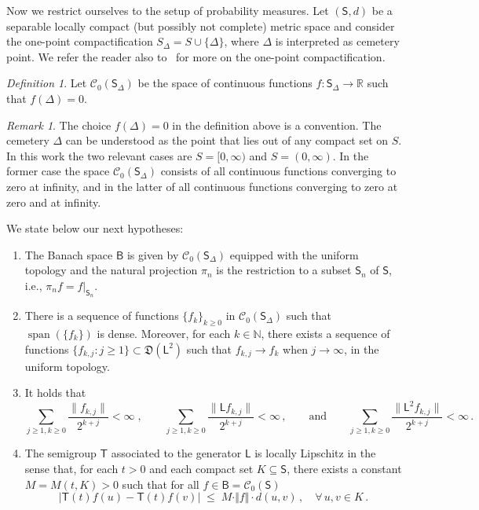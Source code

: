 \documentclass[12pt,a4paper]{article}
\theoremstyle{plain}
\theoremstyle{remark}
\newtheorem{definition}[theorem]{Definition}
\newtheorem{remark}[theorem]{Remark}
\DeclareMathOperator{\spann}{span}
\newcommand{\msf}[1]{{\mathsf #1}}
\newcommand{\mc}[1]{{\mathcal #1}}
\newcommand{\mf}[1]{{\mathfrak #1}}
\newcommand{\bb}[1]{{\mathbb #1}}
\newcommand{\norm}[1]{\lVert#1\rVert}
\begin{document}
	
	Now we restrict ourselves to the setup of probability measures.
	Let $(\msf S,d)$ be a separable  locally compact (but possibly not complete) metric space and consider the one-point compactification $S_\Delta=S\cup \{\Delta\}$, where $\Delta$ is interpreted as cemetery point. We refer the reader also to~\cite{EK} for more on the one-point compactification.
	\begin{definition}\label{def:C_0}
		Let $\mc{C}_0(\msf S_\Delta)$ be the space of continuous functions $f:\msf S_\Delta\to \bb R$ such that $f(\Delta) =0$.
	\end{definition}
	\begin{remark}\label{rem:onepoint}
		The choice $f(\Delta)=0$ in the definition above is a convention. The cemetery $\Delta$ can be understood as the point that lies out of any compact set on $S$. 
		In this work the two relevant cases are $S=[0,\infty)$ and $S=(0,\infty)$. In the former case the space $\mc{C}_0(\msf S_\Delta)$ consists of all continuous functions converging to zero at infinity, and in the latter of all continuous functions converging to zero at zero and at infinity.
	\end{remark}
	We state below our next hypotheses:
	\begin{enumerate}[label=(G\arabic*)]
		\item \label{(G1)} The Banach space $\msf B$ is given by $\mc{C}_0(\msf S_\Delta)$ equipped with the uniform topology and the natural projection $\pi_n$ is the restriction to a subset $\msf S_n$ of $\msf S$, i.e., $\pi_n f= f\vert_{\msf S_n}$.
		\item \label{(G2)} There is a sequence of functions  $\{f_{k}\}_{k\geq 0}$ in $\mc C_0(\msf S_\Delta)$ such that $\spann(\{f_k\})$ is dense. Moreover, for each $k \in \bb{N}$, there exists a sequence of functions $\{f_{k,j}:j \geq 1\} \subset \mf{D}(\msf{L}^2)$ such that $f_{k,j} \to f_k$ when $j \to \infty$, in the uniform topology.
		\item \label{(G3)} 
		It holds that
		\begin{equation}\label{eq:fkj}
			\sum_{j\geq 1,k \geq 0}\frac{\norm{f_{k,j}}}{2^{k+j}} < \infty\;,\qquad \sum_{j\geq 1,k \geq 0}\frac{\norm{\msf{L}f_{k,j}}}{2^{k+j}} < \infty\,,\qquad\text{and}\qquad
			\sum_{j\geq 1,k \geq 0}\frac{\norm{\msf{L}^2f_{k,j}}}{2^{k+j}} < \infty\,.
		\end{equation}
		
		
		\item \label{(G4)} The semigroup $\msf{T}$ associated to the generator $\msf{L}$ is locally Lipschitz in the sense that, for each $t>0$ and each compact set $K\subseteq \msf{S}$, there exists a constant $M = M(t,K)>0$ such that for all $f\in \msf B=\mc{C}_0(\msf S)$
		\begin{equation*}
			\vert  \msf{T}(t)f (u) - \msf{T}(t)f (v) \vert \; \leq \; M\cdot \Vert f\Vert \cdot  d(u,v)\,,\quad \forall\, u,v\in K\,.
		\end{equation*}
		
		
	\end{enumerate}
	
\end{document}
